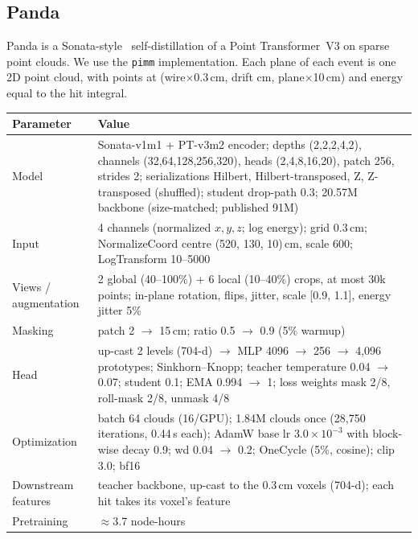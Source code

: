 \documentclass[11pt,a4paper]{article}
\newcommand{\code}[1]{\texttt{\small #1}}
\begin{document}
\subsection{Panda~\cite{panda}}
Panda is a Sonata-style~\cite{sonata} self-distillation of a Point Transformer~V3 on sparse point clouds. We use the \code{pimm} implementation. Each plane of each event is one 2D point cloud, with points at (wire$\times$0.3\,cm, drift cm, plane$\times$10\,cm) and energy equal to the hit integral.
\begin{center}\small
\begin{tabularx}{\textwidth}{lL}
\toprule
Parameter & Value\\
\midrule
Model & Sonata-v1m1 + PT-v3m2 encoder; depths (2,2,2,4,2), channels (32,64,128,256,320), heads (2,4,8,16,20), patch 256, strides 2; serializations Hilbert, Hilbert-transposed, Z, Z-transposed (shuffled); student drop-path 0.3; 20.57M backbone (size-matched; published 91M)\\
Input & 4 channels (normalized $x,y,z$; log energy); grid 0.3\,cm; NormalizeCoord centre (520, 130, 10)\,cm, scale 600; LogTransform 10--5000\\
Views / augmentation & 2 global (40--100\%) + 6 local (10--40\%) crops, at most 30k points; in-plane rotation, flips, jitter, scale [0.9, 1.1], energy jitter 5\%\\
Masking & patch 2 $\to$ 15\,cm; ratio 0.5 $\to$ 0.9 (5\% warmup)\\
Head & up-cast 2 levels (704-d) $\to$ MLP 4096 $\to$ 256 $\to$ 4{,}096 prototypes; Sinkhorn--Knopp; teacher temperature 0.04 $\to$ 0.07; student 0.1; EMA 0.994 $\to$ 1; loss weights mask 2/8, roll-mask 2/8, unmask 4/8\\
Optimization & batch 64 clouds (16/GPU); 1.84M clouds once (28{,}750 iterations, 0.44\,s each); AdamW base lr $3.0\times10^{-3}$ with block-wise decay 0.9; wd 0.04 $\to$ 0.2; OneCycle (5\%, cosine); clip 3.0; bf16\\
Downstream features & teacher backbone, up-cast to the 0.3\,cm voxels (704-d); each hit takes its voxel's feature\\
Pretraining & $\approx$3.7 node-hours\\
\bottomrule
\end{tabularx}
\end{center}
\end{document}
